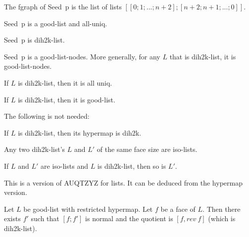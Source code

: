The fgraph of Seed~p is the list of lists $[[0;1;...;n+2];[n+2;n+1;...;0]]$.

\begin{lemma} 
 Seed~p is a good-list and all-uniq.
\end{lemma}



\begin{lemma}
Seed~p is dih2k-list.
\end{lemma}

\begin{lemma}
Seed~p is a good-list-nodes.  More generally, for any $L$ that is dih2k-list,
it is good-list-nodes.
\end{lemma}


\begin{lemma}
If $L$ is dih2k-list, then it is all uniq.
\end{lemma}

\begin{lemma}
If $L$ is dih2k-list, then it is good-list.
\end{lemma}

The following is not needed:

\begin{lemma} If $L$ is dih2k-list, then its hypermap is dih2k.
\end{lemma}

\begin{lemma}
Any two dih2k-list's $L$ and $L'$ of the same face size are iso-lists.
\end{lemma}

\begin{lemma}
If $L$ and $L'$ are iso-lists and $L$ is dih2k-list, then so is $L'$.
\end{lemma}

This is a version of AUQTZYZ for lists.  It can be deduced from the hypermap version.

\begin{lemma}  Let $L$ be good-list with restricted hypermap.
Let $f$ be a face of $L$.  Then there exists $f'$ such that $[f;f']$ is normal and the quotient
is $[f,rev~f]$ (which is dih2k-list).
\end{lemma}

